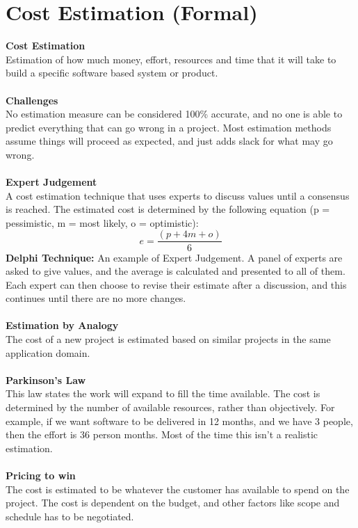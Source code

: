 \documentclass[a4paper,10pt]{article}
\begin{document}
\section*{Cost Estimation (Formal)}
\textcolor{BlueGreen}{\textbf{Cost Estimation}} \\
Estimation of how much money, effort, resources and time that it will take to build a specific software based system or product. \\\\
\textcolor{BlueGreen}{\textbf{Challenges}} \\
No estimation measure can be considered 100\% accurate, and no one is able to predict everything that can go wrong in a project. Most estimation methods assume things will proceed as expected, and just adds slack for what may go wrong. \\\\
\textcolor{BlueGreen}{\textbf{Expert Judgement}} \\
A cost estimation technique that uses experts to discuss values until a consensus is reached. The estimated cost is determined by the following equation (p = pessimistic, m = most likely, o = optimistic): 
\begin{equation*}
	e = \dfrac{(p + 4m + o)}{6}
\end{equation*}
\textbf{Delphi Technique:} An example of Expert Judgement. A panel of experts are asked to give values, and the average is calculated and presented to all of them. Each expert can then choose to revise their estimate after a discussion, and this continues until there are no more changes. \\\\
\textcolor{BlueGreen}{\textbf{Estimation by Analogy}} \\
The cost of a new project is estimated based on similar projects in the same application domain. \\\\
\textcolor{BlueGreen}{\textbf{Parkinson's Law}} \\
This law states the work will expand to fill the time available. The cost is determined by the number of available resources, rather than objectively. For example, if we want software to be delivered in 12 months, and we have 3 people, then the effort is 36 person months. Most of the time this isn't a realistic estimation. \\\\
\textcolor{BlueGreen}{\textbf{Pricing to win}}\\
The cost is estimated to be whatever the customer has available to spend on the project. The cost is dependent on the budget, and other factors like scope and schedule has to be negotiated. \\\\
\end{document}
